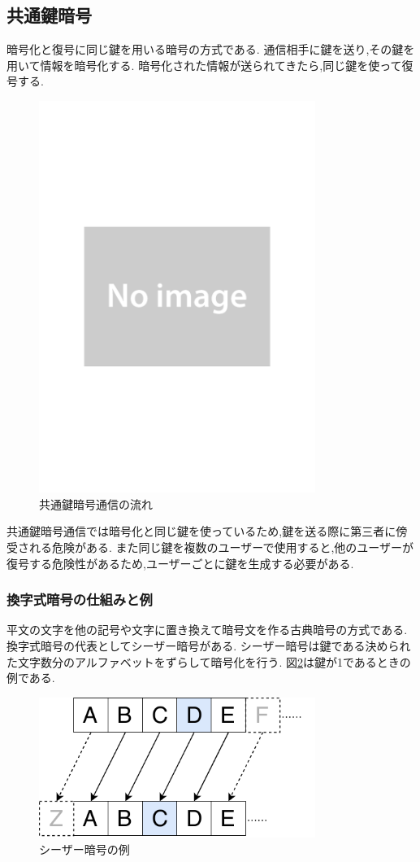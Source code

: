 \documentclass[a4j,12pt]{jsarticle}
\begin{document}
\subsection{共通鍵暗号}
暗号化と復号に同じ鍵を用いる暗号の方式である.
通信相手に鍵を送り,その鍵を用いて情報を暗号化する.
暗号化された情報が送られてきたら,同じ鍵を使って復号する.


\begin{figure}[H]
\centering
\includegraphics[width=9cm]{noimage.pdf}
\caption{共通鍵暗号通信の流れ}
\label{fig:no}
\end{figure} 

共通鍵暗号通信では暗号化と同じ鍵を使っているため,鍵を送る際に第三者に傍受される危険がある.
また同じ鍵を複数のユーザーで使用すると,他のユーザーが復号する危険性があるため,ユーザーごとに鍵を生成する必要がある.



\subsubsection{換字式暗号の仕組みと例}
平文の文字を他の記号や文字に置き換えて暗号文を作る古典暗号の方式である.
換字式暗号の代表としてシーザー暗号がある.
シーザー暗号は鍵である決められた文字数分のアルファベットをずらして暗号化を行う.
図\ref{fig:05}は鍵が1であるときの例である.

\begin{figure}[H]
\centering
\includegraphics[width=9cm]{05.pdf}
\caption{シーザー暗号の例}
\label{fig:05}
\end{figure} 
\end{document}
